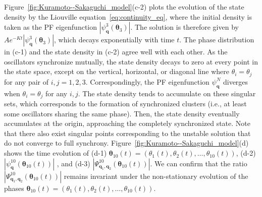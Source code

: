 \documentclass[
amsmath,amssymb,
]{revtex4-2}
\begin{document}
%
Figure~\ref{fig:Kuramoto--Sakaguchi_model}(c-2) plots the evolution of the state density by the Liouville equation~\eqref{eq:continuity_eq}, where the initial density is taken as the PF eigenfunction $\left|\psi^3_{\bm{q}}({\bm \theta}_3)\right|$. The solution is therefore given by $Ae^{-Kt}\left|\psi^3_{\bm{q}}({\bm \theta}_3)\right|$, which decays exponentially with time $t$. 
%
The phase distribution in (c-1) and the state density in (c-2) agree well with each other.
%
As the oscillators synchronize mutually, the state density decays to zero at every point in the state space, except on the vertical, horizontal, or diagonal line where
$\theta_i = \theta_j$ for any pair of $i, j = 1, 2, 3$.
%
Correspondingly, the PF eigenfunction $\psi^N_{\bm{q}}$ diverges when $\theta_i = \theta_j$ for any $i, j$.
%
The state density tends to accumulate on these singular sets, which corresponds to the formation of synchronized clusters (i.e., at least some oscillators sharing the same phase).
%
Then, the state density eventually accumulates at the origin, approaching the completely synchronized state. Note that there also exist singular points corresponding to the unstable solution that do not converge to full synchrony.
%
Figure~\ref{fig:Kuramoto--Sakaguchi_model}(d) shows the time evolution of (d-1) ${\bm \theta}_{10}(t) = (\theta_1(t), \theta_2(t), \ldots, \theta_{10}(t))$,
(d-2) $|\psi^{10}_{\bm{q}}(\bm{\theta}_{10}(t))|$
, and (d-3) $|\Psi^{10}_{\bm{q}_1,\bm{q}_2}(\bm{\theta}_{10}(t))|$.
%
We can confirm that the ratio $|\Psi^{10}_{\bm{q}_1,\bm{q}_2}({\bm \theta}_{10}(t))|$ remains invariant under the non-stationary evolution of the phases ${\bm \theta}_{10}(t) = (\theta_1(t), \theta_2(t), \ldots, \theta_{10}(t))$.
\end{document}
